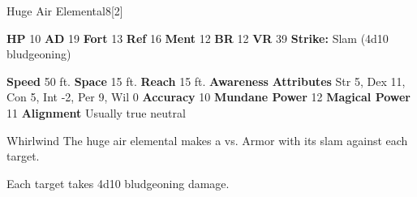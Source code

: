   \begin{monsubsection}{Huge Air Elemental}{8}[2]
    \vspace{-1em}\vspace{-1em}
    \vspace{0em}

    
    

    \begin{spellcontent}
      \begin{spelltargetinginfo}
        \pari \textbf{HP} 10 \monsep
          \textbf{AD} 19 \monsep
          \textbf{Fort} 13 \monsep
          \textbf{Ref} 16 \monsep
          \textbf{Ment} 12
        \pari \textbf{BR} 12 \monsep
        \textbf{VR} 39
        \pari \textbf{Strike:}
            Slam  (4d10 bludgeoning)
      \end{spelltargetinginfo}
    \end{spellcontent}
    \begin{monsterfooter}
      \pari \textbf{Speed} 50 ft. \monsep
        \textbf{Space} 15 ft. \monsep
        \textbf{Reach} 15 ft.
      \pari \textbf{Awareness} 
      \pari \textbf{Attributes}
        Str 5, Dex 11,
        Con 5, Int -2,
        Per 9, Wil 0
      \pari \textbf{Accuracy} 10 \monsep
        \textbf{Mundane Power} 12 \monsep
      \textbf{Magical Power} 11
      \pari \textbf{Alignment} Usually true neutral
    \end{monsterfooter}
  \end{monsubsection}
  \begin{freeability}{Whirlwind}
       The huge air elemental makes a 
         vs. Armor
        with its slam against each target.
    
    \hit Each target takes 4d10 bludgeoning damage.
    \end{freeability}
  

